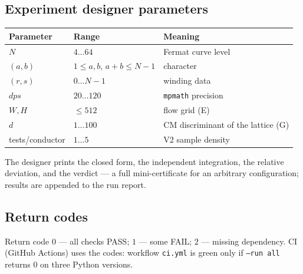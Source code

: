 \subsection{Experiment designer parameters}

\begin{center}
\small
\begin{tabularx}{\textwidth}{@{}l l >{\raggedright\arraybackslash}X@{}}
\toprule
Parameter & Range & Meaning \\
\midrule
$N$ & $4\dots64$ & Fermat curve level \\
$(a,b)$ & $1\le a,b$, $a+b\le N-1$ & character \\
$(r,s)$ & $0\dots N-1$ & winding data \\
$dps$ & $20\dots120$ & \texttt{mpmath} precision \\
$W,H$ & $\le 512$ & flow grid (E) \\
$d$ & $1\dots100$ & CM discriminant of the lattice (G) \\
tests/conductor & $1\dots5$ & V2 sample density \\
\bottomrule
\end{tabularx}
\end{center}

The designer prints the closed form, the independent integration,
the relative deviation, and the verdict --- a full mini-certificate
for an arbitrary configuration; results are appended to the run
report.

\subsection{Return codes}

Return code $0$ --- all checks PASS; $1$ --- some FAIL; $2$ ---
missing dependency. CI (GitHub Actions) uses the codes: workflow
\texttt{ci.yml} is green only if \texttt{--run all} returns $0$ on
three Python versions.
